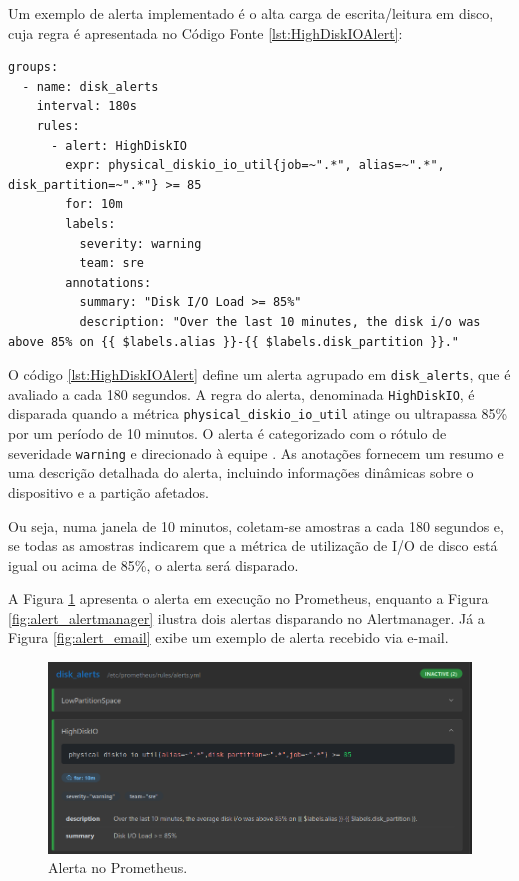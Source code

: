 Um exemplo de alerta implementado é o alta carga de escrita/leitura em disco, cuja regra é apresentada no Código Fonte \ref{lst:HighDiskIOAlert}:

\newpage

\begin{lstlisting}[caption={Alerta para alta carga de escrita/leitura em disco}, label={lst:HighDiskIOAlert}]
groups:
  - name: disk_alerts
    interval: 180s
    rules:
      - alert: HighDiskIO
        expr: physical_diskio_io_util{job=~".*", alias=~".*", disk_partition=~".*"} >= 85
        for: 10m
        labels:
          severity: warning
          team: sre
        annotations:
          summary: "Disk I/O Load >= 85%"
          description: "Over the last 10 minutes, the disk i/o was above 85% on {{ $labels.alias }}-{{ $labels.disk_partition }}."
\end{lstlisting}

O código \ref{lst:HighDiskIOAlert} define um alerta agrupado em \verb|disk_alerts|, que é avaliado a cada 180 segundos. A regra do alerta, denominada \verb|HighDiskIO|, é disparada quando a métrica \verb|physical_diskio_io_util| atinge ou ultrapassa 85\% por um período de 10 minutos. O alerta é categorizado com o rótulo de severidade \verb|warning| e direcionado à equipe . As anotações fornecem um resumo e uma descrição detalhada do alerta, incluindo informações dinâmicas sobre o dispositivo e a partição afetados.

Ou seja, numa janela de 10 minutos, coletam-se amostras a cada 180 segundos e, se todas as amostras indicarem que a métrica de utilização de I/O de disco está igual ou acima de 85\%, o alerta será disparado.

A Figura \ref{fig:alert_prometheus} apresenta o alerta em execução no Prometheus, enquanto a Figura \ref{fig:alert_alertmanager} ilustra dois alertas disparando no Alertmanager. Já a Figura \ref{fig:alert_email} exibe um exemplo de alerta recebido via e-mail. 
\begin{figure}[H]
\centering
\setlength{\abovecaptionskip}{-20pt}
\includegraphics[width=\textwidth]{Imagens/chap04/alerts/alert_prometheus.png}
\caption{Alerta no Prometheus.}
\label{fig:alert_prometheus}
\end{figure}

